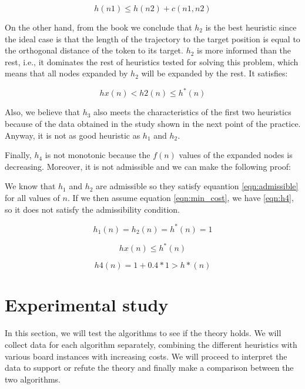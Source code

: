 \documentclass[runningheads]{llncs}
\begin{document}
\begin{equation}\label{eqn:monotone}
    h(n1) \leq h(n2) + c(n1,n2)
\end{equation}

On the other hand, from the book \cite{algorithms_2} we conclude that $h_2$  is the best heuristic since the ideal 
case is that the length of the trajectory to the target position is equal 
to the orthogonal distance of the token to its target. $h_2$ 
is more informed than the rest, i.e., it dominates the rest of heuristics 
tested for solving this problem, which means that all nodes expanded by $h_2$ 
will be expanded by the rest. It satisfies:

\begin{equation}\label{eqn:dominance}
    hx(n) < h2(n) \leq h^*(n)
\end{equation}

Also, we believe that $h_3$ also meets the characteristics 
of the first two heuristics because of the data obtained in the study 
shown in the next point of the practice. Anyway, it is not as good heuristic as $h_1$ and $h_2$.

Finally, $h_4$ is not monotonic because the $f(n)$ values of the expanded 
nodes is decreasing. Moreover, it is not admissible and we can make 
the following proof:

We know that $h_1$ and $h_2$ are admissible so they satisfy equantion \ref{eqn:admissible} for all values of $n$. If we then assume equation 
\ref{eqn:min_cost}, we have \ref{eqn:h4}, 
so it does not satisfy the admissibility condition. 

\begin{equation}\label{eqn:min_cost}
    h_1(n) = h_2(n) = h^*(n) = 1
\end{equation}

\begin{equation}\label{eqn:admissible}
    hx(n) \leq h^*(n)
\end{equation}

\begin{equation}\label{eqn:h4}
    h4(n) = 1 + 0.4*1 > h*(n)
\end{equation}

\section{Experimental study}
In this section, we will test the algorithms to see if the theory holds.
We will collect data for each algorithm separately, combining the different
heuristics with various board instances with increasing costs. We will proceed to
interpret the data to support or refute the theory and finally make a comparison between the two algorithms.
\end{document}
